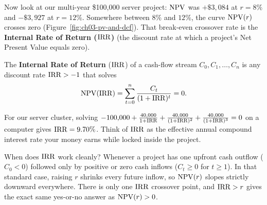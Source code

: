 Now look at our multi-year \$100,000 server project: $\operatorname{NPV}$ was $+\$3{,}084$ at $r = 8\%$ and $-\$3{,}927$ at $r = 12\%$. Somewhere between $8\%$ and $12\%$, the curve $\operatorname{NPV}(r)$ crosses zero (Figure~\ref{fig:ch03-pv-and-dcf}). That break-even crossover rate is the \textbf{Internal Rate of Return ($\operatorname{IRR}$)} (the discount rate at which a project's Net Present Value equals zero).

\begin{definition}
The \textbf{Internal Rate of Return} ($\operatorname{IRR}$) of a cash-flow stream $C_0, C_1, \dots, C_n$ is any discount rate $\operatorname{IRR} > -1$ that solves
\[
 \operatorname{NPV}(\operatorname{IRR}) = \sum_{t=0}^{n} \frac{C_t}{(1+\operatorname{IRR})^t} = 0.
\]
\end{definition}

For our server cluster, solving $-100{,}000 + \frac{40{,}000}{1+\operatorname{IRR}} + \frac{40{,}000}{(1+\operatorname{IRR})^2} + \frac{40{,}000}{(1+\operatorname{IRR})^3} = 0$ on a computer gives $\operatorname{IRR} = 9.70\%$. Think of $\operatorname{IRR}$ as the effective annual compound interest rate your money earns while locked inside the project.

When does $\operatorname{IRR}$ work cleanly? Whenever a project has one upfront cash outflow ($C_0 < 0$) followed only by positive or zero cash inflows ($C_t \ge 0$ for $t \ge 1$). In that standard case, raising $r$ shrinks every future inflow, so $\operatorname{NPV}(r)$ slopes strictly downward everywhere. There is only one $\operatorname{IRR}$ crossover point, and $\operatorname{IRR} > r$ gives the exact same yes-or-no answer as $\operatorname{NPV}(r) > 0$.

